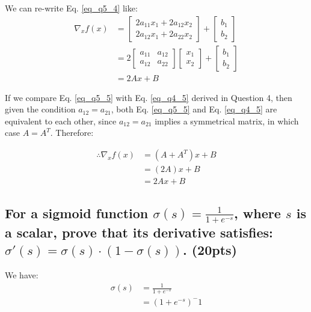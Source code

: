We can re-write Eq. \ref{eq_q5_4} like:
\begin{align}
    \nabla_x f(x) &= 
    \begin{bmatrix}
        2 a_{11}x_1 + 2 a_{12}x_2 \\
        2 a_{12}x_1 + 2 a_{22}x_2
    \end{bmatrix} +
    \begin{bmatrix}
        b_1 \\
        b_2
    \end{bmatrix} \\
    &= 2 
    \begin{bmatrix}
        a_{11} & a_{12} \nonumber \\
        a_{12} & a_{22}
    \end{bmatrix} \begin{bmatrix}
        x_1 \\ x_2
    \end{bmatrix} +
    \begin{bmatrix}
        b_1 \\
        b_2
    \end{bmatrix} \nonumber \\
    &= 2 A x + B
    \label{eq_q5_5}
\end{align}

If we compare Eq. \ref{eq_q5_5} with Eq. \ref{eq_q4_5} derived in Question 4, then given the condition $a_{12}=a_{21}$, both Eq. \ref{eq_q5_5} and Eq. \ref{eq_q4_5} are equivalent to each other, since $a_{12}=a_{21}$ implies a symmetrical matrix, in which case $A = A^T$. Therefore:

\begin{align}
    \therefore \nabla_x f(x) &= (A + A^T) x + B \nonumber \\
    &= (2 A) x + B \nonumber \\
    &= 2 A x + B
    \label{eq_q5_6}
\end{align}

\subsection{For a sigmoid function $\sigma (s)=\frac{1}{1+e^{-s}}$, where $s$ is a scalar, prove that its derivative satisfies: $\sigma'(s) = \sigma(s) \cdot (1-\sigma (s))$. (20pts)}

We have: 
\begin{align}
    \sigma(s) &= \frac{1}{1+e^{-s}} \nonumber \\
    &= (1+e^{-s})^-1
    \label{eq_q6_1}
\end{align}


